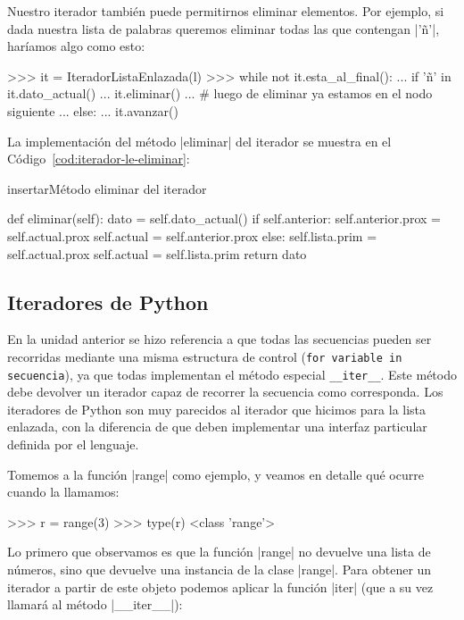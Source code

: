 Nuestro iterador también puede permitirnos eliminar elementos. Por ejemplo, si
dada nuestra lista de palabras queremos eliminar todas las que contengan |'ñ'|,
haríamos algo como esto:

\begin{codigo-python-sn}
>>> it = IteradorListaEnlazada(l)
>>> while not it.esta_al_final():
...     if 'ñ' in it.dato_actual()
...         it.eliminar()
...         # luego de eliminar ya estamos en el nodo siguiente
...     else:
...         it.avanzar()
\end{codigo-python-sn}

La implementación del método |eliminar| del iterador se muestra en el
Código~\ref{cod:iterador-le-eliminar}:

\begin{codigo}{insertar}{Método eliminar del iterador}
\label{cod:iterador-le-eliminar}
\begin{codigo-python}
    def eliminar(self):
        dato = self.dato_actual()
        if self.anterior:
            self.anterior.prox = self.actual.prox
            self.actual = self.anterior.prox
        else:
            self.lista.prim = self.actual.prox
            self.actual = self.lista.prim
        return dato
\end{codigo-python}
\end{codigo}

\subsection{Iteradores de Python}

En la unidad anterior se hizo referencia a que todas las secuencias
pueden ser recorridas mediante una misma estructura de control
(\lstinline!for variable in secuencia!), ya que todas implementan el método
especial \lstinline!__iter__!.  Este método debe devolver un iterador
capaz de recorrer la secuencia como corresponda. Los iteradores de Python son
muy parecidos al iterador que hicimos para la lista enlazada, con la diferencia
de que deben implementar una interfaz particular definida por el lenguaje.

Tomemos a la función |range| como ejemplo, y veamos en detalle qué ocurre
cuando la llamamos:

\begin{codigo-python-sn}
>>> r = range(3)
>>> type(r)
<class 'range'>
\end{codigo-python-sn}

Lo primero que observamos es que la función |range| no devuelve una lista de
números, sino que devuelve una instancia de la clase |range|. Para obtener un
iterador a partir de este objeto podemos aplicar la función |iter| (que a su
vez llamará al método |__iter__|):

